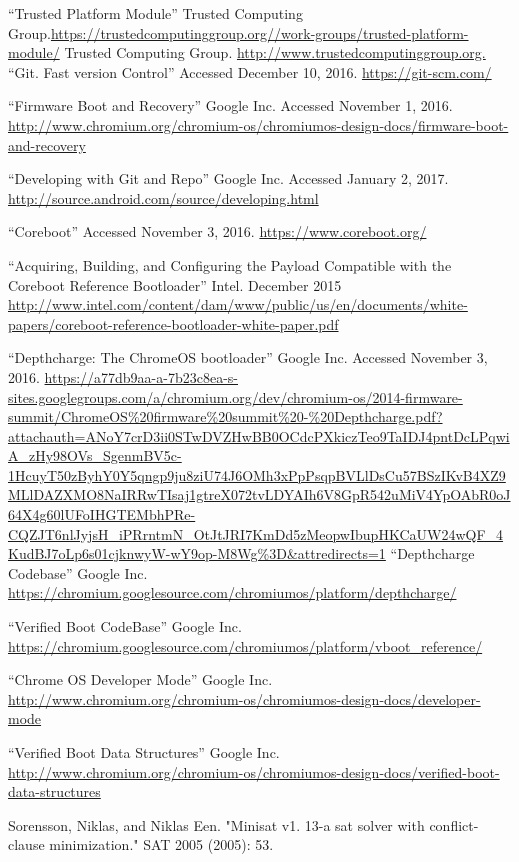\documentclass[../report.tex]{subfiles}
\begin{document}
\begin{singlespace}
\begin{flushleft}
\begin{footnotesize}
\begin{thebibliography}{\kern\bibindent}
        ``Trusted Platform Module'' Trusted Computing Group.\url{https://trustedcomputinggroup.org//work-groups/trusted-platform-module/}
        Trusted Computing Group. \url{http://www.trustedcomputinggroup.org.}
        ``Git. Fast version Control'' Accessed December 10, 2016. \url{https://git-scm.com/}

    ``Firmware Boot and Recovery'' Google Inc. Accessed November 1, 2016. \url{http://www.chromium.org/chromium-os/chromiumos-design-docs/firmware-boot-and-recovery}

    ``Developing with Git and Repo'' Google Inc. Accessed January 2, 2017. \url{http://source.android.com/source/developing.html}

    ``Coreboot'' Accessed November 3, 2016. \url{https://www.coreboot.org/}

    ``Acquiring, Building, and Configuring the Payload Compatible with the Coreboot Reference Bootloader'' Intel. December 2015 \url{http://www.intel.com/content/dam/www/public/us/en/documents/white-papers/coreboot-reference-bootloader-white-paper.pdf}

    ``Depthcharge: The ChromeOS bootloader'' Google Inc. Accessed November 3, 2016.
    \url{https://a77db9aa-a-7b23c8ea-s-sites.googlegroups.com/a/chromium.org/dev/chromium-os/2014-firmware-summit/ChromeOS\%20firmware\%20summit\%20-\%20Depthcharge.pdf?attachauth=ANoY7crD3ii0STwDVZHwBB0OCdcPXkiczTeo9TaIDJ4pntDcLPqwiA_zHy98OVs_SgenmBV5c-1HcuyT50zByhY0Y5qngp9ju8ziU74J6OMh3xPpPsqpBVLlDsCu57BSzIKvB4XZ9MLlDAZXMO8NaIRRwTIsaj1gtreX072tvLDYAIh6V8GpR542uMiV4YpOAbR0oJ64X4g60lUFoIHGTEMbhPRe-CQZJT6nlJyjsH_iPRrntmN_OtJtJRI7KmDd5zMeopwIbupHKCaUW24wQF_4KudBJ7oLp6s01cjknwyW-wY9op-M8Wg\%3D&attredirects=1}
    ``Depthcharge Codebase'' Google Inc. \url{https://chromium.googlesource.com/chromiumos/platform/depthcharge/}

    ``Verified Boot CodeBase'' Google Inc. \url{https://chromium.googlesource.com/chromiumos/platform/vboot_reference/}

    ``Chrome OS Developer Mode'' Google Inc. \url{http://www.chromium.org/chromium-os/chromiumos-design-docs/developer-mode}

    ``Verified Boot Data Structures'' Google Inc. \url{http://www.chromium.org/chromium-os/chromiumos-design-docs/verified-boot-data-structures}

    Sorensson, Niklas, and Niklas Een. "Minisat v1. 13-a sat solver with conflict-clause minimization." SAT 2005 (2005): 53.
\end{thebibliography}
\end{footnotesize}
\end{flushleft}
\end{singlespace}
\endgroup
\end{document}
